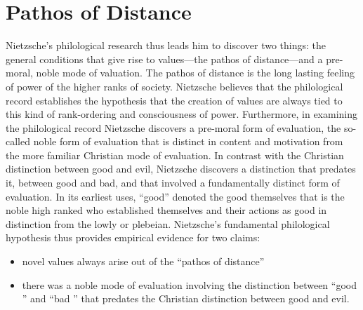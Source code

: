\section{Pathos of Distance}\label{sec:pathos_of_distance} %

Nietzsche's philological research thus leads him to discover two things: the general conditions that give rise to values---the pathos of distance---and a pre-moral, noble mode of valuation. The pathos of distance is the long lasting feeling of power of the higher ranks of society. Nietzsche believes that the philological record establishes the hypothesis that the creation of values are always tied to this kind of rank-ordering and consciousness of power. Furthermore, in examining the philological record Nietzsche discovers a pre-moral form of evaluation, the so-called noble form of evaluation that is distinct in content and motivation from the more familiar Christian mode of evaluation. In contrast with the Christian distinction between good and evil, Nietzsche discovers a distinction that predates it, between good and bad, and that involved a fundamentally distinct form of evaluation. In its earliest uses, ``good'' denoted the good themselves that is the noble high ranked who established themselves and their actions as good in distinction from the lowly or plebeian. Nietzsche's fundamental philological hypothesis thus provides empirical evidence for two claims:
\begin{itemize}
    \item novel values always arise out of the ``pathos of distance'' 
    \item there was a noble mode of evaluation involving the distinction between ``good '' and  ``bad '' that predates the Christian distinction between good and evil.
\end{itemize}

\change

